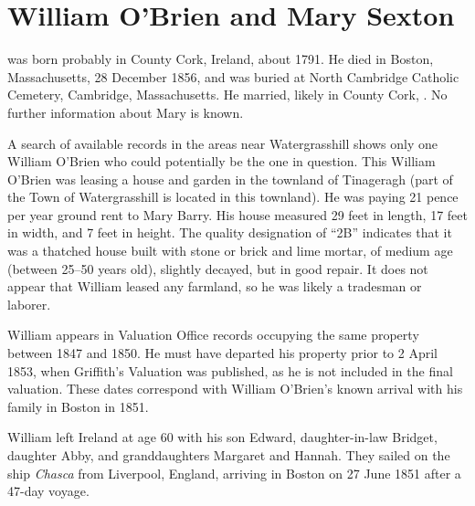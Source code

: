 \section{William O'Brien and Mary Sexton}\label{per:William1OBrien}

 was born probably in County Cork, Ireland, about 1791.\cite{Census1855William:1} He died in Boston, Massachusetts, 28 December 1856,\cite{William1OBrienDeath:1} and was buried at North Cambridge Catholic Cemetery, Cambridge, Massachusetts.\cite{DianaBerberenaLetter1:1} He married, likely in County Cork, .\cite{MarySexton} No further information about Mary is known.

A search of available records in the areas near Watergrasshill shows only one William O'Brien who could potentially be the one in question. This William O'Brien was leasing a house and garden in the townland of Tinageragh (part of the Town of Watergrasshill is located in this townland). He was paying 21 pence per year ground rent to Mary Barry.\cite{TenureBook1847:1} His house measured 29 feet in length, 17 feet in width, and 7 feet in height.\cite{HouseBook1849} The quality designation of ``2B'' indicates that it was a thatched house built with stone or brick and lime mortar, of medium age (between 25--50 years old), slightly decayed, but in good repair. It does not appear that William leased any farmland, so he was likely a tradesman or laborer.\cite{WilliamOBrienSearch:1} 

William appears in Valuation Office records occupying the same property between 1847\cite{TenureBook1847:2} and 1850.\cite{HouseBook1850} He must have departed his property prior to 2 April 1853, when Griffith's Valuation was published, as he is not included in the final valuation.\cite{WilliamOBrienSearch:2} These dates correspond with William O'Brien's known arrival with his family in Boston in 1851.

William left Ireland at age 60 with his son Edward, daughter-in-law Bridget, daughter Abby, and granddaughters Margaret and Hannah. They sailed on the ship \textit{Chasca}\cite{Chascay2:2} from Liverpool, England, arriving in Boston on 27 June 1851 after a 47-day voyage.\cite{Chascay:5}

